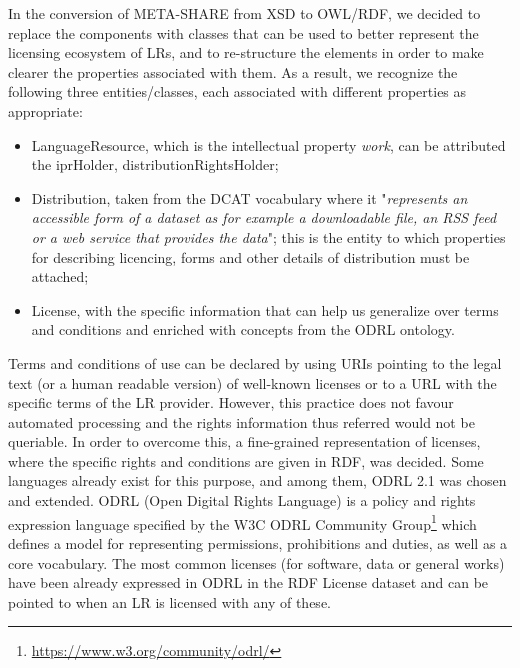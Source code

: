 \documentclass{llncs}
\begin{document}
{In the conversion of META-SHARE from XSD to OWL/RDF, we decided to replace the components with classes that can be used to better represent the licensing ecosystem of LRs, and to re-structure the elements in order to make clearer the properties associated with them. As a result, we recognize the following three entities/classes, each associated with different properties as appropriate:
\begin{itemize}
\item LanguageResource, which is the intellectual property \textit{work}, can be attributed the iprHolder, distributionRightsHolder;
\item Distribution, taken from the DCAT vocabulary where it "\textit{represents an accessible form of a dataset as for example a downloadable file, an RSS feed or a web service that provides the data}"; this is the entity to which properties for describing licencing, forms and other details of distribution must be attached;
\item License, with the specific information that can help us generalize over terms and conditions and enriched with concepts from the ODRL ontology.
\end{itemize}


Terms and conditions of use can be declared by using URIs pointing to the legal text (or a human readable version) of well-known licenses or to a URL with the specific terms of the LR provider. However, this practice does not favour automated processing and the rights information thus referred would not be queriable. In order to overcome this, a fine-grained representation of licenses, where the specific rights and conditions are given in RDF, was decided. 
Some languages already exist for this purpose, and among them, ODRL 2.1 was chosen and extended. ODRL (Open Digital Rights Language) is a policy and rights expression language specified by the W3C ODRL Community Group\footnote{\url{https://www.w3.org/community/odrl/}} which defines a model for representing permissions, prohibitions and duties, as well as a core vocabulary. 
The most common licenses (for software, data or general works) have been already expressed in ODRL in the RDF License dataset\cite{rdflicense} and can be pointed to when an LR is licensed with any of these.

}
\end{document}
